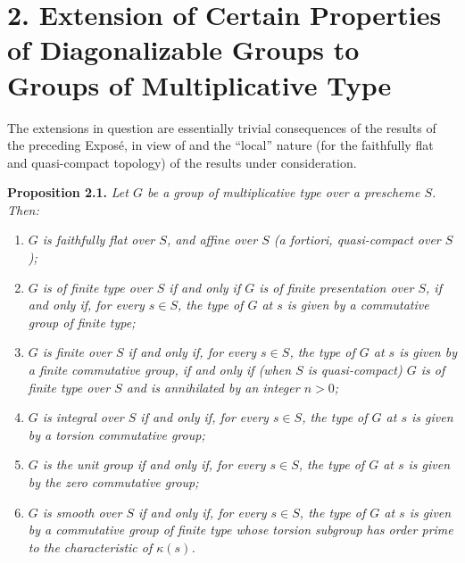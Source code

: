 

\section*{2. Extension of Certain Properties of Diagonalizable Groups to Groups of Multiplicative Type}

The extensions in question are essentially trivial consequences of the
results of the preceding Expos\'e, in view of
 and the
``local'' nature (for the faithfully flat and quasi-compact topology) of
the results under consideration.

\medskip
\noindent{}\textbf{Proposition 2.1.}
\textit{Let \(G\) be a group of multiplicative type over a prescheme
\(S\). Then:}
\begin{enumerate}
  \item[(a)]
  \textit{\(G\) is faithfully flat over \(S\), and affine over \(S\)
  (a fortiori, quasi-compact over \(S\));}

  \item[(b)]
  \textit{\(G\) is of finite type over \(S\) if and only if \(G\) is of
  finite presentation over \(S\), if and only if, for every \(s\in S\),
  the type of \(G\) at \(s\) is given by a commutative group of finite
  type;}

  \item[(c)]
  \textit{\(G\) is finite over \(S\) if and only if, for every
  \(s\in S\), the type of \(G\) at \(s\) is given by a finite commutative
  group, if and only if (when \(S\) is quasi-compact) \(G\) is of finite
  type over \(S\) and is annihilated by an integer \(n>0\);}

  \item[\((c')\)]
  \textit{\(G\) is integral over \(S\) if and only if, for every
  \(s\in S\), the type of \(G\) at \(s\) is given by a torsion
  commutative group;}

  \item[(d)]
  \textit{\(G\) is the unit group if and only if, for every \(s\in S\),
  the type of \(G\) at \(s\) is given by the zero commutative group;}

  \item[(e)]
  \textit{\(G\) is smooth over \(S\) if and only if, for every
  \(s\in S\), the type of \(G\) at \(s\) is given by a commutative group
  of finite type whose torsion subgroup has order prime to the
  characteristic of \(\kappa(s)\).}
\end{enumerate}

